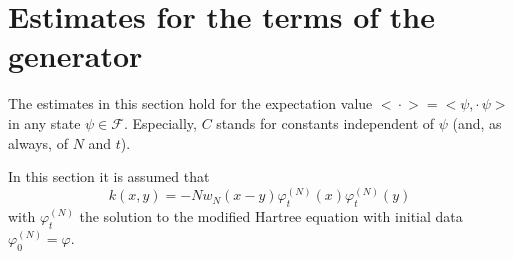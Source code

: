 \documentclass[11pt,a4paper,draft,DIV11]{scrartcl}	%
\newcommand{\fock}{\mathcal{F}}		%
\newcommand{\scal}[2]{\big<#1,#2\big>} %
\newcommand{\ev}[1]{\big<#1\big>}	%
\newcommand{\ph}{\varphi_t^{(N)}}	%
\begin{document}

\appendix
\section{Estimates for the terms of the generator}
\label{ch:generatorestimates}
\label{s:generatorestimates}
The estimates in this section hold for the expectation value $\ev{\cdot} = \scal{\psi}{\cdot\,\psi}$ in any state $\psi \in \fock$. Especially, $C$ stands for constants independent of $\psi$ (and, as always, of $N$ and $t$).

In this section it is assumed that
\[k(x,y) = - N w_N(x-y)\ph(x)\ph(y)\]
with $\ph$ the solution to the modified Hartree equation with initial data $\varphi^{(N)}_0 = \varphi$.
\end{document}
